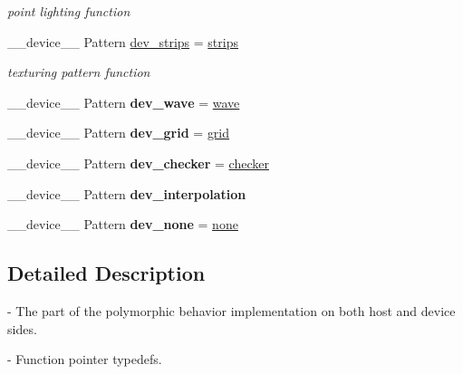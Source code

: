 \begin{DoxyCompactItemize}
\begin{DoxyCompactList}\small\item\em point lighting function \end{DoxyCompactList}\item 
\+\_\+\+\_\+device\+\_\+\+\_\+ Pattern \hyperlink{group__device__pointers_ga2efdb7a5e4237c7f66bf1b71f1839335}{dev\+\_\+strips} = \hyperlink{group__intersection__test__prperties_gae0b690ff7b5f9b93e53bb0c1437fbf55}{strips}\hypertarget{group__device__pointers_ga2efdb7a5e4237c7f66bf1b71f1839335}{}\label{group__device__pointers_ga2efdb7a5e4237c7f66bf1b71f1839335}

\begin{DoxyCompactList}\small\item\em texturing pattern function \end{DoxyCompactList}\item 
\+\_\+\+\_\+device\+\_\+\+\_\+ Pattern {\bfseries dev\+\_\+wave} = \hyperlink{group__intersection__test__prperties_gaff97add1678535636b1f4f1ca3f7a96c}{wave}\hypertarget{group__device__pointers_ga106fc9eb2215ecfb1360a3334a8f22dd}{}\label{group__device__pointers_ga106fc9eb2215ecfb1360a3334a8f22dd}

\item 
\+\_\+\+\_\+device\+\_\+\+\_\+ Pattern {\bfseries dev\+\_\+grid} = \hyperlink{group__intersection__test__prperties_ga4db329f1c6b211cd0ac9e6dc297f279e}{grid}\hypertarget{group__device__pointers_gaf458f0bb79e06d9beaee341c3955cb1c}{}\label{group__device__pointers_gaf458f0bb79e06d9beaee341c3955cb1c}

\item 
\+\_\+\+\_\+device\+\_\+\+\_\+ Pattern {\bfseries dev\+\_\+checker} = \hyperlink{group__intersection__test__prperties_ga100df37360dfe6954f51431bc6343dc6}{checker}\hypertarget{group__device__pointers_ga0a22f4af565cbe3e8e8eb8719d3ac30f}{}\label{group__device__pointers_ga0a22f4af565cbe3e8e8eb8719d3ac30f}

\item 
\+\_\+\+\_\+device\+\_\+\+\_\+ Pattern {\bfseries dev\+\_\+interpolation}\hypertarget{group__device__pointers_ga050793208c04dff921d09f103558fded}{}\label{group__device__pointers_ga050793208c04dff921d09f103558fded}

\item 
\+\_\+\+\_\+device\+\_\+\+\_\+ Pattern {\bfseries dev\+\_\+none} = \hyperlink{group__intersection__test__prperties_ga6ea9f9e6624268a263962a17c6634feb}{none}\hypertarget{group__device__pointers_ga5e312ec8917b7248b60bffc6f165618b}{}\label{group__device__pointers_ga5e312ec8917b7248b60bffc6f165618b}

\end{DoxyCompactItemize}


\subsection{Detailed Description}
-\/ The part of the polymorphic behavior implementation on both host and device sides.

-\/ Function pointer typedefs. 